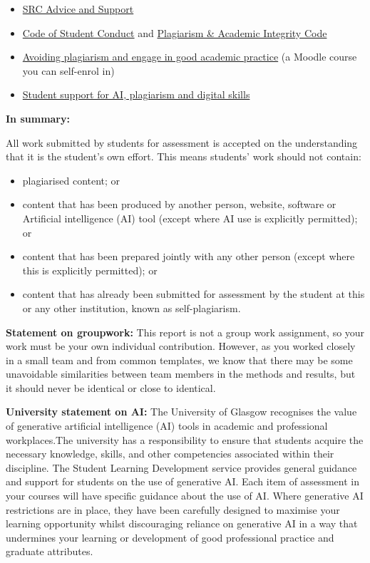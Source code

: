 \documentclass[
  english,
  letterpaper,
  DIV=11,
  numbers=noendperiod]{scrreprt}
\providecommand{\tightlist}{%
  \setlength{\itemsep}{0pt}\setlength{\parskip}{0pt}}
\begin{document}
\begin{itemize}
\tightlist
\item
  \href{https://www.glasgowunisrc.org/advice/}{SRC Advice and Support}
\item
  \href{https://www.gla.ac.uk/myglasgow/apg/policies/uniregs/regulations2025-26/feesandgeneral/studentsupportandconductmatters/reg33/}{Code
  of Student Conduct} and
  \href{https://www.gla.ac.uk/myglasgow/apg/policies/uniregs/regulations2025-26/feesandgeneral/studentsupportandconductmatters/reg32/}{Plagiarism
  \& Academic Integrity Code}
\item
  \href{https://moodle.gla.ac.uk/course/view.php?id=13038}{Avoiding
  plagiarism and engage in good academic practice} (a Moodle course you
  can self-enrol in)
\item
  \href{https://www.gla.ac.uk/myglasgow/sld/}{Student support for AI,
  plagiarism and digital skills}
\end{itemize}

\textbf{In summary:}

All work submitted by students for assessment is accepted on the
understanding that it is the student's own effort. This means students'
work should not contain:

\begin{itemize}
\tightlist
\item
  plagiarised content; or
\item
  content that has been produced by another person, website, software or
  Artificial intelligence (AI) tool (except where AI use is explicitly
  permitted); or
\item
  content that has been prepared jointly with any other person (except
  where this is explicitly permitted); or
\item
  content that has already been submitted for assessment by the student
  at this or any other institution, known as self-plagiarism.
\end{itemize}

\textbf{Statement on groupwork:} This report is not a group work
assignment, so your work must be your own individual contribution.
However, as you worked closely in a small team and from common
templates, we know that there may be some unavoidable similarities
between team members in the methods and results, but it should never be
identical or close to identical.

\textbf{University statement on AI:} The University of Glasgow
recognises the value of generative artificial intelligence (AI) tools in
academic and professional workplaces.The university has a responsibility
to ensure that students acquire the necessary knowledge, skills, and
other competencies associated within their discipline. The Student
Learning Development service provides general guidance and support for
students on the use of generative AI. Each item of assessment in your
courses will have specific guidance about the use of AI. Where
generative AI restrictions are in place, they have been carefully
designed to maximise your learning opportunity whilst discouraging
reliance on generative AI in a way that undermines your learning or
development of good professional practice and graduate attributes.
\end{document}
